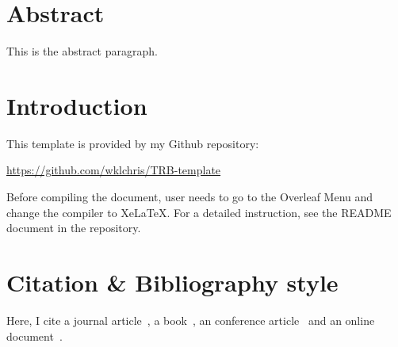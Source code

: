 \documentclass[12pt]{trbart}
\begin{document}
\linenumbers%
\maketitle

\section{Abstract}
This is the abstract paragraph.



\section{Introduction}
This template is provided by my Github repository:

\url{https://github.com/wklchris/TRB-template}

Before compiling the document, user needs to go to the Overleaf Menu and change the compiler to XeLaTeX. For a detailed instruction, see the README document in the repository.

\section{Citation \& Bibliography style}

Here, I cite a journal article~\autocite{egarticle}, a book~\autocite{egbook}, an conference article~\autocite{egconference} and an online document~\autocite{egonline}.


\printtrbrefs%
\end{document}
